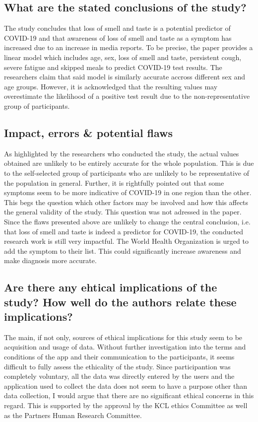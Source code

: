 \documentclass{article}
\begin{document}
\subsection{What are the stated conclusions of the study?}

The study concludes that loss of smell and taste is a potential predictor of COVID-19
and that awareness of loss of smell and taste as a symptom has increased due to
an increase in media reports. To be precise, the paper provides a linear model which includes age,
sex, loss of smell and taste, persistent cough, severe fatigue and skipped meals to
predict COVID-19 test results. The researchers claim that said model is similarly accurate
accross different sex and age groups. However, it is acknowledged that the resulting
values may overestimate the likelihood of a positive test result due to the non-representative
group of participants. 

\subsection{Impact, errors \& potential flaws}

As highlighted by the researchers who conducted the study, the actual values
obtained are unlikely to be entirely accurate for the whole population. This is
due to the self-selected group of participants who are unlikely to be representative
of the population in general. Further, it is rightfully pointed out that
some symptoms seem to be more indicative of COVID-19 in one region than the other.
This begs the question which other factors may be involved and how this affects
the general validity of the study. This question was not adressed in the paper.\\
\indent Since the flaws presented above are unlikely to change the central conclusion,
i.e. that loss of smell and taste is indeed a predictor for COVID-19, the
conducted research work is still very impactful. The World Health Organization
is urged to add the symptom to their list. This could significantly increase
awareness and make diagnosis more accurate.

\subsection{Are there any ehtical implications of the study? How well do the authors relate these implications?}

The main, if not only, sources of ethical implications for this study seem to be acquisition and
usage of data. Without further investigation into the terms and conditions
of the app and their communication to the participants, it seems difficult
to fully assess the ethicality of the study. Since participantion was completely
voluntary, all the data was directly entered by the users and the application
used to collect the data does not seem to have a purpose other than data collection, 
I would argue that there are no significant ethical concerns in this regard.
This is supported by the approval by the KCL ethics Committee as well as the
Partners Human Research Committee.
\end{document}
